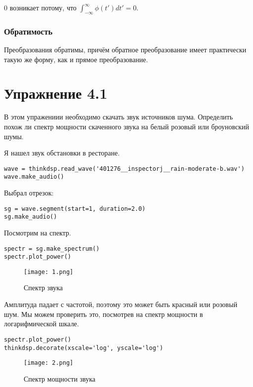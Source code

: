 \documentclass[a4paper,12pt]{report}
\begin{document}
0 возникает потому, что $\int_{-\infty}^{\infty} \phi(t') dt' = 0$.

\subsection{Обратимость}

Преобразования обратимы, причём обратное преобразование имеет практически такую же форму, как и прямое преобразование.

\chapter{Упражнение 4.1}
В этом упражениии необходимо скачать звук  источников шума. Определить похож ли спектр мощности скаченного звука на белый розовый или броуновский шумы.

Я нашел звук обстановки в ресторане.

\begin{lstlisting}[caption=Прослушивание скачанного шума]
wave = thinkdsp.read_wave('401276__inspectorj__rain-moderate-b.wav')
wave.make_audio()
\end{lstlisting}

Выбрал отрезок:

\begin{lstlisting}[caption=Выбор короткого отрезка]
sg = wave.segment(start=1, duration=2.0)
sg.make_audio()
\end{lstlisting}

Посмотрим на спектр.

\begin{lstlisting}[caption=Спектр звука]
spectr = sg.make_spectrum()
spectr.plot_power()
\end{lstlisting}

\begin{figure}[H]
        \centering
        \texttt{[image: 1.png]}
        \caption{Спектр звука}
        \label{fig:lab4_fig1_1}
\end{figure}

Амплитуда падает с частотой, поэтому это может быть красный или розовый шум. Мы можем проверить это, посмотрев на спектр мощности в логарифмической шкале.

\begin{lstlisting}[caption=Спектр мощности звука]
spectr.plot_power()
thinkdsp.decorate(xscale='log', yscale='log')
\end{lstlisting}

\begin{figure}[H]
        \centering
        \texttt{[image: 2.png]}
        \caption{Спектр мощности звука}
        \label{fig:lab4_fig1_2}
\end{figure}
\end{document}

